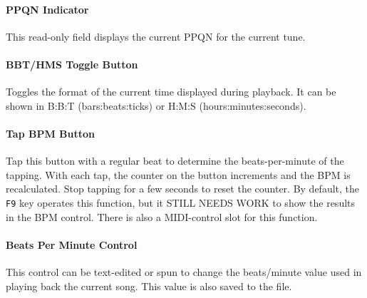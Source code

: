 \documentclass[
 11pt,
 twoside,
 a4paper,
 final                                 %
]{article}
\begin{document}
\paragraph{PPQN Indicator}
\label{paragraph:introduction_ppqn_indicator}

   This read-only field displays the current PPQN for the current tune.


\paragraph{BBT/HMS Toggle Button}
\label{paragraph:introduction_time_format_toggle_button}

   Toggles the format of the current time displayed during playback. 
   It can be shown in B:B:T (bars:beats:ticks) or H:M:S (hours:minutes:seconds).

\paragraph{Tap BPM Button}
\label{paragraph:introduction_tap_bpm_button}

   Tap this button with a regular beat to determine the beats-per-minute of the
   tapping.  With each tap, the counter on the button increments and the BPM is
   recalculated.  Stop tapping for a few seconds to reset the counter.
   By default, the \texttt{F9} key operates this function, but it
   STILL NEEDS WORK to show the results in the BPM control.
   There is also a MIDI-control slot for this function.

\paragraph{Beats Per Minute Control}
\label{paragraph:introduction_bpm_control}

   This control can be text-edited or spun to change the beats/minute value
   used in playing back the current song.  This value is also saved to the
   file.





\end{document}
